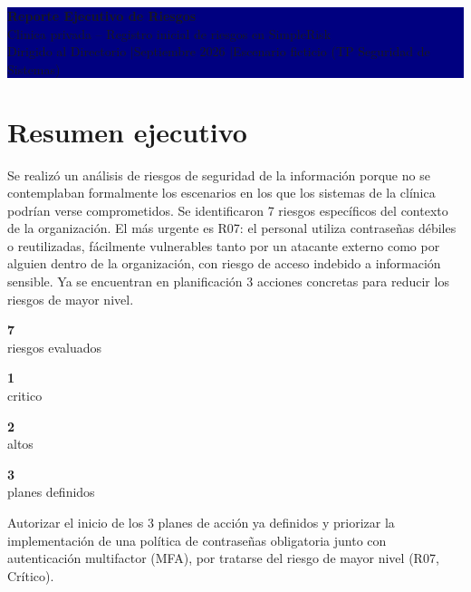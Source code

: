 \documentclass[11pt,a4paper]{article}
\newcommand{\metric}[3]{%
\begin{minipage}[t]{0.235\linewidth}
\colorbox{#1}{\parbox[c][1.35cm][c]{0.92\linewidth}{\centering\color{navy}\textbf{\Large #2}\\[-1mm]\scriptsize #3}}
\end{minipage}}
\begin{document}
\begin{center}
\colorbox{navy}{\parbox{\textwidth}{\centering
\vspace{3mm}
{\color{white}\Huge\bfseries Reporte Ejecutivo de Riesgos}\\[2mm]
{\color{white}\large Clinica privada -- Registro inicial de riesgos en SimpleRisk}\\[2mm]
{\color{white}\small Dirigido al Directorio \quad$\vert$\quad Septiembre 2026 \quad$\vert$\quad Escenario ficticio (TP Seguridad de Sistemas)}
\vspace{3mm}
}}
\end{center}

\vspace{4mm}

\section*{Resumen ejecutivo}

Se realiz\'o un an\'alisis de riesgos de seguridad de la informaci\'on porque no se
contemplaban formalmente los escenarios en los que los sistemas de la cl\'inica
podr\'ian verse comprometidos. Se identificaron 7 riesgos espec\'ificos del contexto
de la organizaci\'on. El m\'as urgente es R07: el personal utiliza contrase\~nas
d\'ebiles o reutilizadas, f\'acilmente vulnerables tanto por un atacante externo como
por alguien dentro de la organizaci\'on, con riesgo de acceso indebido a informaci\'on
sensible. Ya se encuentran en planificaci\'on 3 acciones concretas para reducir los
riesgos de mayor nivel.

\vspace{2mm}
\noindent
\metric{griscaja}{7}{riesgos evaluados}\hfill
\metric{nivelcritico!55}{1}{critico}\hfill
\metric{nivelalto!55}{2}{altos}\hfill
\metric{azulsuave}{3}{planes definidos}

\vspace{4mm}

\begin{decisionbox}
Autorizar el inicio de los 3 planes de acci\'on ya definidos y priorizar la
implementaci\'on de una pol\'itica de contrase\~nas obligatoria junto con
autenticaci\'on multifactor (MFA), por tratarse del riesgo de mayor nivel (R07,
Cr\'itico).
\end{decisionbox}

\vspace{4mm}
\end{document}
